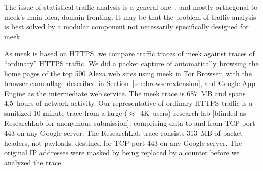 \documentclass{sig-alternate}
\newcommand{\meek}{meek\xspace}
\newcommand{\lbl}{ResearchLab\xspace}
\begin{document}
The issue of statistical traffic analysis is a general one~\cite{trafficmorphing},
and mostly orthogonal to \meek's main idea, domain fronting.
It may be that the problem of traffic analysis is
best solved by a modular component not
necessarily specifically designed for \meek.

As \meek is based on HTTPS,
we compare traffic traces of \meek against
traces of ``ordinary'' HTTPS traffic.
We did a packet capture
of automatically browsing the home pages
of the top 500 Alexa web sites using \meek in Tor Browser,
with the browser camouflage described in Section~\ref{sec:browserextension},
and Google App Engine as the intermediate web service.
The \meek trace is 687~MB
and spans 4.5~hours of network activity.
Our representative of ordinary HTTPS traffic
is a sanitized 10-minute trace
from 
a large ($\approx$~4K~users)
research lab [blinded as \lbl for anonymous submission],
comprising data to and from TCP port 443 on any Google server.
The \lbl trace consists 313~MB of packet headers,
not payloads, destined for TCP port 443 on any Google server.
The original IP addresses were masked by being
replaced by a counter before we analyzed the trace.
\end{document}
